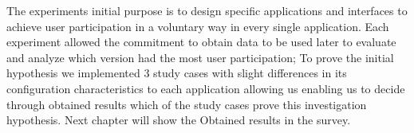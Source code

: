 The experiments initial purpose is to design specific applications and interfaces to achieve user participation in a voluntary way in every single application. Each experiment allowed the commitment to obtain data to be used later  to evaluate and analyze which version had the most user participation; To prove the initial hypothesis we implemented 3 study cases with slight differences in its configuration characteristics to each application allowing us enabling us to decide through obtained results which of the study cases prove this investigation hypothesis. Next chapter will show the Obtained results in the survey.


